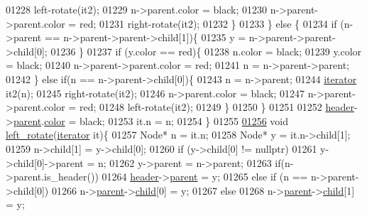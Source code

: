 \begin{DoxyCode}
01228         left-rotate(it2);
01229         n->parent.color = black;
01230         n->parent->parent.color = red;
01231         right-rotate(it2);
01232         \}
01233     \} \textcolor{keywordflow}{else} \{
01234         \textcolor{keywordflow}{if} (n->parent == n->parent->parent->child[1])\{
01235         y = n->parent->parent->child[0];
01236     \}
01237     \textcolor{keywordflow}{if} (y.color == red)\{
01238         n.color = black;
01239         y.color = black;
01240         n->parent->parent.color = red;
01241         n = n->parent->parent;
01242     \} \textcolor{keywordflow}{else} \textcolor{keywordflow}{if}(n == n->parent->child[0])\{
01243         n = n->parent;
01244         \hyperlink{classaed2_1_1iterator}{iterator} it2(n);
01245         right-rotate(it2);
01246         n->parent.color = black;
01247         n->parent->parent.color = red;
01248         left-rotate(it2);
01249     \}
01250 \}
01251 
01252     \hyperlink{classaed2_1_1map_a92d93f905c8ad73fba18fdc7e8915cce_a92d93f905c8ad73fba18fdc7e8915cce}{header}->\hyperlink{structaed2_1_1map_1_1Node_a91a1855da19d22344bc89c2f8b998a7a_a91a1855da19d22344bc89c2f8b998a7a}{parent}.\hyperlink{structaed2_1_1map_1_1Node_a58dd9993fee8ee3eaa5716b72a3eca47_a58dd9993fee8ee3eaa5716b72a3eca47}{color} = black;
01253     it.n = n;
01254 \}
01255 
\hyperlink{classaed2_1_1map_a1f4b383ece3e22680802d27aa11b623a_a1f4b383ece3e22680802d27aa11b623a}{01256} \textcolor{keywordtype}{void} \hyperlink{classaed2_1_1map_a1f4b383ece3e22680802d27aa11b623a_a1f4b383ece3e22680802d27aa11b623a}{left\_rotate}(\hyperlink{classaed2_1_1iterator}{iterator} it)\{
01257     Node* n = it.n;
01258     Node* y = it.n->child[1];
01259     n->child[1] = y->child[0];
01260     \textcolor{keywordflow}{if} (y->child[0] != \textcolor{keyword}{nullptr})
01261         y->child[0]->parent = n;
01262     y->parent = n->parent;
01263     \textcolor{keywordflow}{if}(n->parent.is\_header())
01264         \hyperlink{classaed2_1_1map_a92d93f905c8ad73fba18fdc7e8915cce_a92d93f905c8ad73fba18fdc7e8915cce}{header}->\hyperlink{structaed2_1_1map_1_1Node_a91a1855da19d22344bc89c2f8b998a7a_a91a1855da19d22344bc89c2f8b998a7a}{parent} = y;
01265     \textcolor{keywordflow}{else} if (n == n->parent->child[0])
01266         n->\hyperlink{structaed2_1_1map_1_1Node_a91a1855da19d22344bc89c2f8b998a7a_a91a1855da19d22344bc89c2f8b998a7a}{parent}->\hyperlink{structaed2_1_1map_1_1Node_acac3478cefbd8bebe0c3f3abb9a2935e_acac3478cefbd8bebe0c3f3abb9a2935e}{child}[0] = y;
01267     \textcolor{keywordflow}{else}
01268         n->\hyperlink{structaed2_1_1map_1_1Node_a91a1855da19d22344bc89c2f8b998a7a_a91a1855da19d22344bc89c2f8b998a7a}{parent}->\hyperlink{structaed2_1_1map_1_1Node_acac3478cefbd8bebe0c3f3abb9a2935e_acac3478cefbd8bebe0c3f3abb9a2935e}{child}[1] = y;

\end{DoxyCode}
